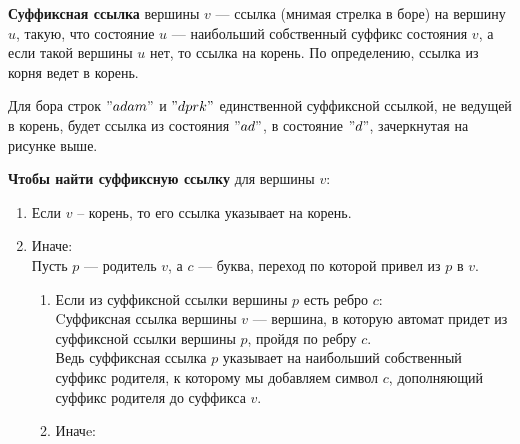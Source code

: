 \begin{Def}
	\textbf{Суффиксная ссылка} вершины $v$ --- ссылка (мнимая стрелка в боре) на вершину $u$, такую, что состояние $u$ --- наибольший собственный суффикс состояния $v$, а если такой вершины  $u$ нет, то ссылка на корень. По определению, ссылка из корня ведет в корень.
\end{Def}

\begin{example}
	Для бора строк $"adam"$ и $"dprk"$ единственной суффиксной ссылкой, не ведущей в корень, будет ссылка из состояния $"ad"$, в состояние $"d"$, зачеркнутая на рисунке выше.
\end{example}

\textbf{Чтобы найти суффиксную ссылку} для вершины $v$: 
\begin{enumerate}
	\item Если $v$ -- корень, то его ссылка указывает на корень.
	\item Иначе: \\  
		  Пусть $p$ --- родитель  $v$, а  $c$ --- буква, переход по которой привел из  $p$ в  $v$. \\
		\begin{enumerate}
			\item Если из суффиксной ссылки вершины $p$ есть ребро $c$: \\
		  		  Cуффиксная ссылка вершины $v$ --- вершина, в которую автомат придет из суффиксной ссылки вершины $p$, пройдя по ребру $c$. \\
		  		  Ведь суффиксная ссылка $p$ указывает на наибольший собственный суффикс родителя, к которому мы добавляем символ $c$, дополняющий суффикс родителя до суффикса  $v$. \\
			\item Иначe: \\
				  
		\end{enumerate}
\end{enumerate}

